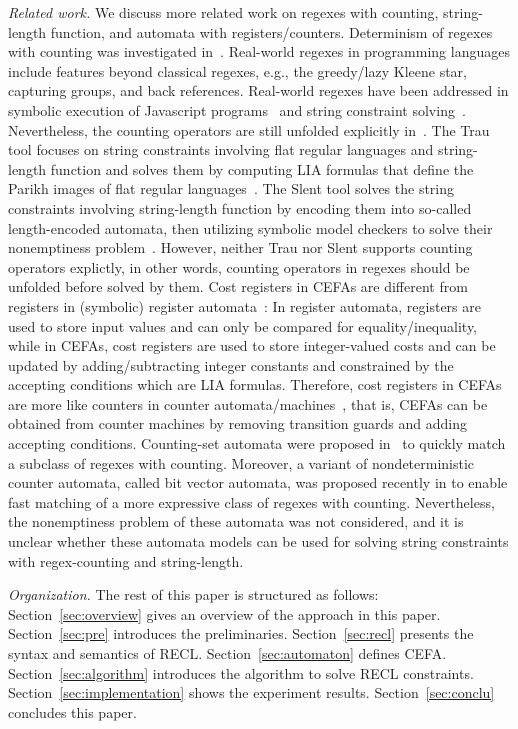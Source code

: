\medskip
\noindent
\emph{Related work.} 
We discuss more related work on regexes with counting, string-length function, and automata with registers/counters.  
%
Determinism of regexes with counting was investigated in~\cite{GGM12,CL15}. 
%
Real-world regexes in programming languages include features beyond classical regexes, e.g., the greedy/lazy Kleene star, capturing groups, and back references. Real-world regexes have been addressed in symbolic execution of Javascript programs~\cite{LMK19} and string constraint solving~\cite{CF+22}. 
Nevertheless, the counting operators are still unfolded explicitly in~\cite{CF+22}. 
%
The Trau tool focuses on string constraints involving flat regular languages and string-length function and solves them by computing LIA formulas that define the Parikh images of flat regular languages~\cite{z3trau}. The Slent tool solves the string constraints involving string-length function by encoding them into so-called length-encoded automata, then utilizing symbolic model checkers to solve their nonemptiness problem~\cite{WC+18}. However, neither Trau nor Slent supports counting operators explictly, in other words, counting operators in regexes should be unfolded before solved by them.
%
Cost registers in CEFAs are different from registers in (symbolic) register automata~\cite{ra,sra}:  In register automata, registers are used to store input values and  can only be compared for equality/inequality, while in CEFAs, cost registers are used to store integer-valued costs and can be updated by adding/subtracting integer constants and constrained by the accepting conditions which are LIA formulas.
%
Therefore, cost registers in CEFAs are more like counters in counter automata/machines~\cite{Minsky67}, that is, CEFAs can be obtained from counter machines by removing  transition guards and adding accepting conditions. 
%
%
Counting-set automata were proposed in~\cite{redos_lenka,HS+23} to quickly match a subclass of regexes with counting. Moreover, a variant of nondeterministic counter automata, called bit vector automata, was proposed recently in \cite{GKM23} to enable fast matching of a more expressive class of regexes with counting.   Nevertheless, the nonemptiness problem of these automata was not considered, and it is unclear whether these automata models can be used for solving string constraints with regex-counting and string-length. 


\smallskip
\noindent
\emph{Organization.} 
The rest of this paper is structured as follows: Section~\ref{sec:overview} gives an overview of the approach in this paper. Section~\ref{sec:pre} introduces the preliminaries. 
Section~\ref{sec:recl} presents the syntax and semantics of RECL. 
Section~\ref{sec:automaton} defines CEFA. Section~\ref{sec:algorithm} introduces the algorithm to solve RECL constraints. Section~\ref{sec:implementation} shows the experiment results. Section~\ref{sec:conclu} concludes this paper.
